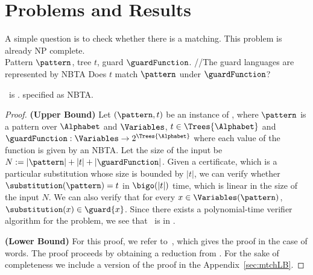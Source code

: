 
\section{Problems and Results}\label{sec:problemsAndResults}

A simple question is to check whether there is a matching.  This problem is already NP complete. \\
\noindent
\probdef{\matchingProblemFull\ }
{Pattern $\pattern$, tree $t$, guard $\guardFunction$. {\color{gray} \slash\slash The guard languages are represented by NBTA }}
{Does $t$ match $\pattern$ under $\guardFunction$?}

\begin{theorem}\label{thm:matching}
    \matchingProblemFull\ is \nptc. %
    specified as NBTA.
\end{theorem}
\begin{proof}
        \textbf{(Upper Bound)} Let $(\pattern, t)$ be an instance of
        \matchingProblemFull, where $\pattern$ is a pattern over
        $\Alphabet$ and
        $\Variables$, $t \in
        \Trees{\Alphabet}$ and $\guardFunction : \Variables \to 2^{\Trees{\Alphabet}}$ where each value of the function is given by an NBTA. Let the size of the input be $N :=
        |\pattern| + |t| + |\guardFunction|$. Given a certificate, which is a particular
        substitution whose size is bounded by $|t|$, we can verify whether $\substitution(\pattern) =
        t$ in $\bigo(|t|)$ time, which is linear in the size of the
        input $N$. We can also verify that for every $x \in
        \Variables(\pattern)$, $\substitution(x) \in
        \guard{x}$. Since there exists a polynomial-time verifier
        algorithm for the problem, we see that \matchingProblemFull\
        is in \np.
	
	\textbf{(Lower Bound)} For this proof, we refer to~\cite{mtchLBound},
        which gives the proof in the case of words. The proof proceeds
        by obtaining a reduction from \oneInThreeSatFull. For the sake
        of completeness we include a version of the proof in the Appendix~\ref{sec:mtchLB}.
\end{proof}

